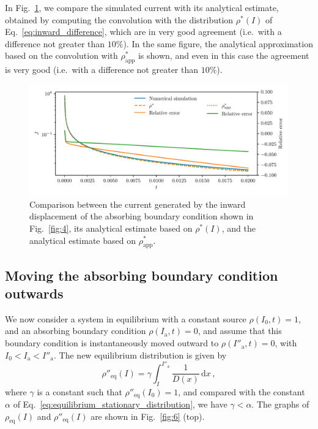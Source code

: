 {In Fig.~\ref{fig:5}, we compare the simulated current with its analytical estimate, obtained by computing the convolution with the distribution $\rho^\ast(I)$ of Eq.~\eqref{eq:inward_difference}, which are in very good agreement {(i.e.\ with a difference not greater than $10\%$)}. In the same figure, the analytical approximation based on the convolution with $\rho^\ast_\text{app}$ is shown, and even in this case the agreement is very good {(i.e.\ with a difference not greater than $10\%$)}.

\begin{figure}[t]
    \centering
    \includegraphics[width=\textwidth]{4_probing_the_diffusive_behavior/figs/final/current_backwards.pdf}
    \caption{Comparison between the current generated by the inward displacement of the absorbing boundary condition shown in Fig.~\ref{fig:4}, its analytical estimate based on $\rho^\ast(I)$, and the analytical estimate based on $\rho^\ast_\text{app}$.}
    \label{fig:5}
\end{figure}


\subsection{Moving the absorbing boundary condition outwards}


We now consider a system in equilibrium with a constant source $\rho(I_0, t)=1$, and an absorbing boundary condition $\rho(I_\mathrm{a}, t)=0$, and assume that this boundary condition is instantaneously moved outward to $\rho(I''_\mathrm{a}, t)=0$, with $I_0 < I_\mathrm{a} < I''_\mathrm{a}$. The new equilibrium distribution is given by
\begin{equation}
    \rho''_\text{eq}(I) = \gamma \int_I^{I''_\mathrm{a}} \frac{1}{D(x)}\,\mathrm{d}x\,,
\end{equation}
where $\gamma$ is a constant such that $\rho''_\text{eq}(I_0)=1$, and compared with the constant $\alpha$ of Eq.~\eqref{eq:equilibrium_stationary_distribution}, we have $\gamma < \alpha$. The graphs of $\rho_\text{eq}(I)$ and $\rho''_\text{eq}(I)$ are shown in Fig.~\ref{fig:6} (top). 

}
